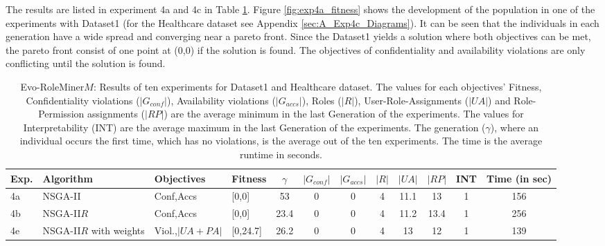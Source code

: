 The results are listed in experiment 4a and 4c in Table \ref{tab:exp4_results}. Figure \ref{fig:exp4a_fitness} shows the development of the population in one of the experiments with Dataset1 (for the Healthcare dataset see Appendix \ref{sec:A_Exp4c_Diagrams}). It can be seen that the individuals in each generation have a wide spread and converging near a pareto front. Since the Dataset1 yields a solution where both objectives can be met, the pareto front consist of one point at (0,0) if the solution is found. The objectives of confidentiality and availability violations are only conflicting until the solution is found.

\begin{table}[H]
	\centering
	\caption{Evo-RoleMiner$M$: Results of ten experiments for Dataset1 and Healthcare dataset. The values for each objectives' Fitness, Confidentiality violations ($|G_{conf}|$), Availability violations ($|G_{accs}|$), Roles ($|R|$), User-Role-Assignments ($|UA|$) and Role-Permission assignments ($|RP|$) are the average minimum in the last Generation of the experiments. The values for Interpretability (INT) are the average maximum in the last Generation of the experiments. The generation ($\gamma$), where an individual occurs the first time, which has no violations, is the average out of the ten experiments. The time is the average runtime in seconds.}
	\label{tab:exp4_results}
	\begin{adjustbox}{width=\textwidth}
		\begin{tabular}{|l|l|l|l|c|c|c|c|c|c|c|c|}
			\hline
			\rowcolor{myGray} 
			\textbf{Exp.} & \textbf{Algorithm} & \textbf{Objectives} & \textbf{Fitness} & $\gamma$ & \textbf{$|G_{conf}|$} & \textbf{$|G_{accs}|$} & \textbf{$|R|$} & \textbf{$|UA|$} & \textbf{$|RP|$} & \textbf{INT} & \textbf{Time (in sec)}\\ \hline
			4a & NSGA-II & Conf,Accs &  [0,0] &  53 & 0   &   0 & 4   &   11.1   &   13   &   1    & 156\\ \hline
			4b & NSGA-II$R$ & Conf,Accs &   [0,0] &   23.4 &0   &   0 & 4   &   11.2   &   13.4   &   1    & 256\\ \hline
			4e & NSGA-II$R$ with weights & Viol.,$|UA+PA|$ &   [0,24.7] &   26.2 &   0 & 0 &4   &   13   &   12   &   1    & 139\\ \hline			
		\end{tabular}
	\end{adjustbox}
	\begin{adjustbox}{width=\textwidth}

\end{adjustbox}
\end{table}
